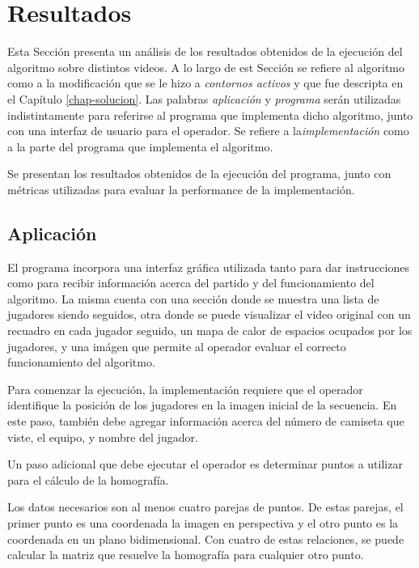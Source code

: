 \chapter{Resultados}
\label{chap-results}

Esta Sección presenta un análisis de los resultados obtenidos de la ejecución del algoritmo sobre distintos videos. A lo largo de est Sección se refiere al algoritmo como a la modificación que se le hizo a \textit{contornos activos} y que fue descripta en el Capítulo \ref{chap-solucion}. Las palabras \textit{aplicación} y \textit{programa} serán utilizadas indistintamente para referirse al programa que implementa dicho algoritmo, junto con una interfaz de usuario para el operador. Se refiere a la\textit{implementación} como a la parte del programa que implementa el algoritmo.

Se presentan los resultados obtenidos de la ejecución del programa, junto con métricas utilizadas para evaluar la performance de la implementación. 

\section{Aplicación}

El programa incorpora una interfaz gráfica utilizada tanto para dar instrucciones como para recibir información acerca del partido y del funcionamiento del algoritmo. La misma cuenta con una sección donde se muestra una lista de jugadores siendo seguidos, otra donde se puede visualizar el video original con un recuadro en cada jugador seguido, un mapa de calor de espacios ocupados por los jugadores, y una imágen que permite al operador evaluar el correcto funcionamiento del algoritmo.

Para comenzar la ejecución, la implementación requiere que el operador identifique la posición de los jugadores en la imagen inicial de la secuencia. En este paso, también debe agregar información acerca del número de camiseta que viste, el equipo, y nombre del jugador.

Un paso adicional que debe ejecutar el operador es determinar puntos a utilizar para el cálculo de la homografía.

Los datos necesarios son al menos cuatro parejas de puntos. De estas parejas, el primer punto es una coordenada la imagen en perspectiva y el otro punto es la coordenada en un plano bidimensional. Con cuatro de estas relaciones, se puede calcular la matriz que resuelve la homografía para cualquier otro punto.  

